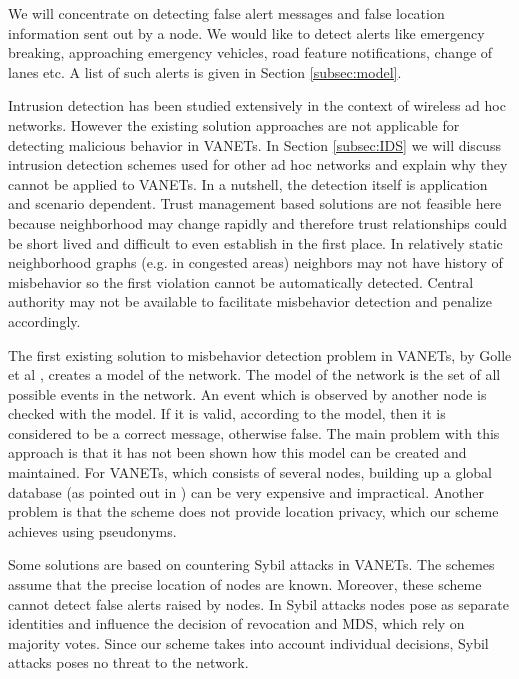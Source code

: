 \documentclass[conference]{IEEEtran}[10pt]
\begin{document}
We will concentrate on detecting false alert messages and false location information sent out by a node. 
We would like to detect alerts like  emergency breaking, approaching emergency vehicles, road feature notifications, change of lanes etc. 
A list of such alerts is given in Section \ref{subsec:model}. 


Intrusion detection has been studied extensively in the context of wireless ad hoc networks. However the existing solution approaches are not applicable for detecting 
malicious behavior in VANETs. 
In Section \ref{subsec:IDS} we will discuss intrusion detection schemes
used for other ad hoc networks and explain why they cannot be applied to VANETs. In a nutshell, the detection itself is application and scenario dependent. Trust management based solutions are not feasible here because neighborhood may change rapidly and therefore trust relationships could be short lived and difficult to even establish in the first place. In relatively static neighborhood graphs (e.g. in congested areas) neighbors may not have history of misbehavior so the first violation cannot be automatically detected. Central authority may not be available to facilitate misbehavior detection and penalize accordingly. 



The first existing solution to misbehavior detection problem in VANETs, by Golle et al \cite{GGS04}, creates a model of the network. 
The model of the network is the set of all possible events in the network. 
An event which is observed by another node is checked with the model. If it is valid, according to the model, 
then it is considered to be a correct message, otherwise false. 
The main problem with this approach is that it has not been shown how this model can be created and maintained. 
For VANETs, which consists of several nodes, building up a global database (as pointed out in \cite{GGS04})
can be very expensive and impractical. 
Another problem is that the scheme does not provide location privacy, which our scheme achieves using pseudonyms. 



Some solutions \cite{ZCNC07,PATZ09} are based on countering Sybil attacks \cite{D02} in VANETs. 
The schemes assume that the precise location of nodes are known. 
Moreover, these scheme cannot detect false alerts raised by nodes. 
In Sybil attacks nodes pose as separate identities and influence the decision of revocation and MDS, which rely on majority votes.
Since our scheme takes into account individual decisions, Sybil attacks poses no threat to the network.
\end{document}
